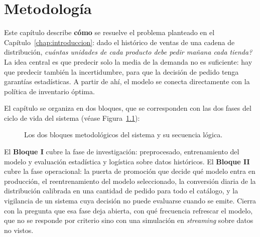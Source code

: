 \chapter{Metodología}
\label{chap:metodologia}

Este capítulo describe \textbf{cómo} se resuelve el problema planteado en el Capítulo~\ref{chap:introduccion}: dado el histórico de ventas de una cadena de distribución, \emph{\textquestiondown cuántas unidades de cada producto debe pedir mañana cada tienda?} La idea central es que predecir solo la media de la demanda no es suficiente: hay que predecir también la incertidumbre, para que la decisión de pedido tenga garantías estadísticas. A partir de ahí, el modelo se conecta directamente con la política de inventario óptima.

El capítulo se organiza en dos bloques, que se corresponden con las dos fases del ciclo de vida del sistema (véase Figura~\ref{fig:bloques_metodologia}):

\begin{figure}[H]
\centering
\shorthandoff{>}%
\shorthandon{>}%
\caption{Los dos bloques metodológicos del sistema y su secuencia lógica.}
\label{fig:bloques_metodologia}
\end{figure}

El \textbf{Bloque I} cubre la fase de investigación: preprocesado, entrenamiento del modelo y evaluación estadística y logística sobre datos históricos. El \textbf{Bloque II} cubre la fase operacional: la puerta de promoción que decide qué modelo entra en producción, el reentrenamiento del modelo seleccionado, la conversión diaria de la distribución calibrada en una cantidad de pedido para todo el catálogo, y la vigilancia de un sistema cuya decisión no puede evaluarse cuando se emite. Cierra con la pregunta que esa fase deja abierta, con qué frecuencia refrescar el modelo, que no se responde por criterio sino con una simulación en \textit{streaming} sobre datos no vistos.

